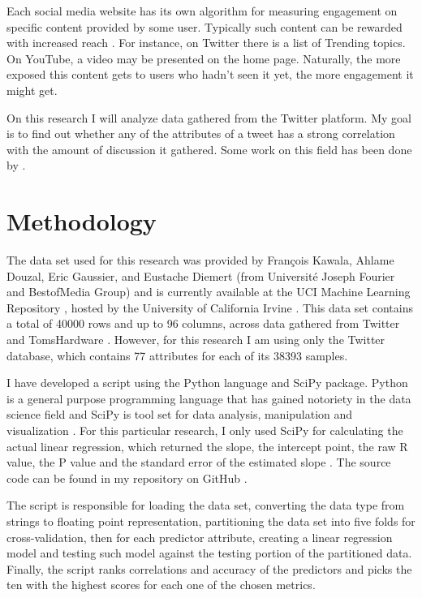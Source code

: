 \documentclass[11pt]{article}
\begin{document}
Each social media website has its own algorithm for measuring engagement on specific content provided by some user. Typically such content can be rewarded with increased reach \cite{milan2015algorithms}. For instance, on Twitter there is a list of Trending topics. On YouTube, a video may be presented on the home page. Naturally, the more exposed this content gets to users who hadn't seen it yet, the more engagement it might get.

On this research I will analyze data gathered from the Twitter platform. My goal is to find out whether any of the attributes of a tweet has a strong correlation with the amount of discussion it gathered.  Some work on this field has been done by \cite{kawala:hal-00881395}. 


\section {Methodology}
\label{method}

The data set used for this research was provided by François Kawala, Ahlame Douzal, Eric Gaussier, and Eustache Diemert (from Université Joseph Fourier and BestofMedia Group) and is currently available at the UCI Machine Learning Repository \cite{sets}, hosted by the University of California Irvine \cite{re3dataorg}. This data set contains a total of 40000 rows and up to 96 columns, across data gathered from Twitter and TomsHardware \cite{team}. However, for this research I am using only the Twitter database, which contains 77 attributes for each of its 38393 samples.

I have developed a script using the Python language and SciPy package. Python is a general purpose programming language \cite{van1995python} \cite{programming} that has gained notoriety in the data science field \cite{kdnuggets} \cite{results} and SciPy is tool set for data analysis, manipulation and visualization \cite{blanco2013learning}. For this particular research, I only used SciPy for calculating the actual linear regression, which returned the slope, the intercept point, the raw R value, the P value and the standard error of the estimated slope \cite{guide}. The source code can be found in my repository on GitHub \cite{thiagorcdlsocial_media_buzz}.

The script is responsible for loading the data set, converting the data type from strings to floating point representation, partitioning the data set into five folds for cross-validation, then for each predictor attribute, creating a linear regression model and testing such model against the testing portion of the partitioned data. Finally, the script ranks correlations and accuracy of the predictors and picks the ten with the highest scores for each one of the chosen metrics.
\end{document}
